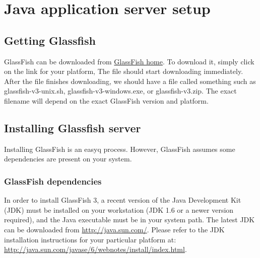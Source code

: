 
\section{Java application server setup}
\subsection{Getting Glassfish}
GlassFish can be downloaded from \href{http://glassfish.dev.java.net}{GlassFish
home}. To download it, simply click on the link for your platform, The file
should start downloading immediately. After the file finishes downloading, we
should have a file called something such as glassfish-v3-unix.sh,
glassfish-v3-windows.exe, or glassfish-v3.zip. The exact filename will depend on
the exact GlassFish version and platform.

\subsection{Installing Glassfish server}
Installing GlassFish is an easyq process. However, GlassFish assumes some
dependencies are present on your system.

\subsubsection{GlassFish dependencies}
In order to install GlassFish 3, a recent version of the Java Development Kit
(JDK) must be installed on your workstation (JDK 1.6 or a newer version
required), and the Java executable must be in your system path. The latest JDK
can be downloaded from \url{http://java.sun.com/}. Please refer to the JDK
installation instructions for your particular platform at:
\\
\url{http://java.sun.com/javase/6/webnotes/install/index.html}.

